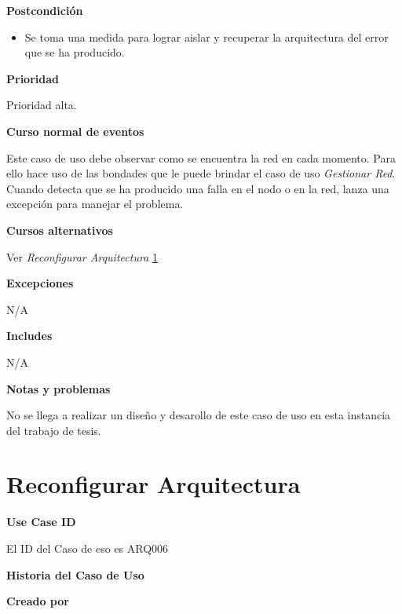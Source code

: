 \large\textbf{Postcondición}
\begin{itemize}
\item Se toma una medida para lograr aislar y recuperar la arquitectura
  del error que se ha producido.
\end{itemize}
\large\textbf{Prioridad}
\vspace{3mm}

Prioridad alta.

\large\textbf{Curso normal de eventos}
\vspace{3mm}

Este caso de uso debe observar como se encuentra la red en cada momento. Para
ello hace uso de las bondades que le puede brindar el caso de uso \textit{
  Gestionar Red}. Cuando detecta que se ha producido una falla en el nodo o en la red,
lanza una excepción para manejar el problema. 

\large\textbf{Cursos alternativos}
\vspace{3mm}

Ver \textit{Reconfigurar Arquitectura} \ref{uc:ReconfigurarArquitectura}

\large\textbf{Excepciones}
\vspace{3mm}

N/A

\large\textbf{Includes}
\vspace{3mm}

N/A

\large\textbf{Notas y problemas}
\vspace{3mm}

No se llega a realizar un diseño y desarollo de este caso de uso
en esta instancia del trabajo de tesis.



\section{Reconfigurar Arquitectura}\label{uc:ReconfigurarArquitectura}

\large\textbf{Use Case ID}
\vspace{3mm}

El ID del Caso de eso es ARQ006

\Large\textbf{Historia del Caso de Uso}
\vspace{3mm}

\large\textbf{Creado por}
\vspace{3mm}

